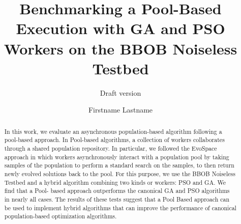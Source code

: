 \documentclass[sigconf]{acmart}
\begin{document}
\title{Benchmarking a Pool-Based Execution with GA and PSO Workers  
on the BBOB Noiseless Testbed}
\subtitle{Draft version}



\author{Firstname Lastname}
%
%
%
%
%
%
%

\renewcommand{\shortauthors}{Firstname Lastname et. al.}


\begin{abstract} In this work, we evaluate an asynchronous population-based
algorithm following a pool-based approach. In Pool-based algorithms, a
collection of workers collaborates through a shared population repository. In
particular, we followed the EvoSpace approach in which workers asynchronously
interact with a population pool by taking samples of the population to perform a
standard search on the samples, to then return newly evolved solutions back to
the pool. For this purpose, we use the BBOB Noiseless Testbed and a hybrid
algorithm combining two kinds or workers:  PSO  and GA. We find that a Pool-
based approach outperforms the canonical GA and PSO algorithms in nearly all
cases. The results of these tests suggest that a Pool Based approach can be used
to implement hybrid algorithms that can improve the performance of canonical
population-based optimization algorithms. \end{abstract}
\end{document}
